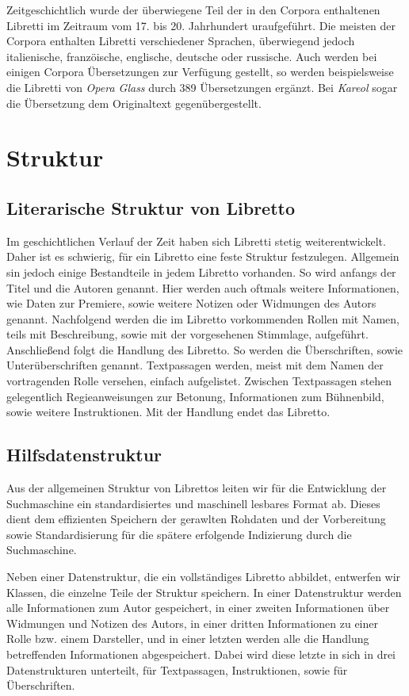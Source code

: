 Zeitgeschichtlich wurde der überwiegene Teil der
in den Corpora enthaltenen Libretti
im Zeitraum vom 17. bis 20. Jahrhundert uraufgeführt.
Die meisten der Corpora enthalten Libretti verschiedener Sprachen,
überwiegend jedoch italienische, franzöische,
englische, deutsche oder russische.
Auch werden bei einigen Corpora Übersetzungen zur Verfügung gestellt,
so werden beispielsweise die Libretti von \emph{Opera Glass}
durch 389 Übersetzungen ergänzt.
Bei \emph{Kareol} sogar die Übersetzung
dem Originaltext gegenübergestellt.

\section{Struktur}

\subsection{Literarische Struktur von Libretto}
Im geschichtlichen Verlauf der Zeit haben sich Libretti
stetig weiterentwickelt.
Daher ist es schwierig, für ein Libretto eine feste Struktur festzulegen.
Allgemein sin jedoch einige Bestandteile in jedem Libretto vorhanden.
So wird anfangs der Titel und die Autoren genannt.
Hier werden auch oftmals weitere Informationen, wie Daten zur Premiere,
sowie weitere Notizen oder Widmungen des Autors genannt.
Nachfolgend werden die im Libretto vorkommenden Rollen mit Namen,
teils mit Beschreibung, sowie mit der vorgesehenen Stimmlage, aufgeführt.
Anschließend folgt die Handlung des Libretto.
So werden die Überschriften, sowie Unterüberschriften genannt.
Textpassagen werden, meist mit dem Namen der vortragenden Rolle versehen,
einfach aufgelistet. Zwischen Textpassagen stehen gelegentlich
Regieanweisungen zur Betonung, Informationen zum Bühnenbild,
sowie weitere Instruktionen.
Mit der Handlung endet das Libretto.

\subsection{Hilfsdatenstruktur}
Aus der allgemeinen Struktur von Librettos
leiten wir für die Entwicklung der Suchmaschine
ein standardisiertes und maschinell lesbares Format ab.
Dieses dient dem effizienten Speichern der gerawlten Rohdaten
und der Vorbereitung sowie Standardisierung
für die spätere erfolgende Indizierung durch die Suchmaschine.

Neben einer Datenstruktur, die ein vollständiges Libretto abbildet,
entwerfen wir Klassen, die einzelne Teile der Struktur speichern.
In einer Datenstruktur werden alle Informationen zum Autor gespeichert,
in einer zweiten Informationen über Widmungen und Notizen des Autors,
in einer dritten Informationen zu einer Rolle bzw. einem Darsteller,
und in einer letzten werden alle
die Handlung betreffenden Informationen abgespeichert.
Dabei wird diese letzte in sich in drei Datenstrukturen unterteilt,
für Textpassagen, Instruktionen, sowie für Überschriften.

